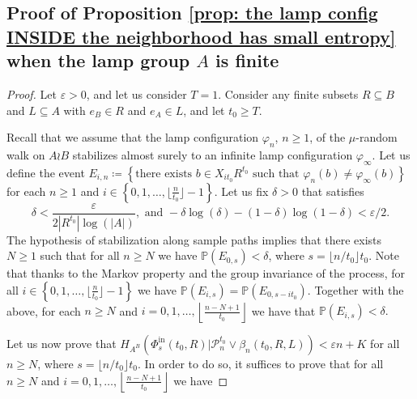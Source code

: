 \documentclass[reqno,oneside,11pt]{amsart}
\renewcommand{\P}{\mathbb{P}}
\theoremstyle{plain}
\theoremstyle{definition}
\begin{document}
\subsection{Proof of Proposition \ref{prop: the lamp config INSIDE the neighborhood has small entropy} when the lamp group $A$ is finite}\label{subsection: proof of lamps inside for FINITE lamp group}
\begin{proof}
	Let $\varepsilon>0$, and let us consider $T=1$. Consider any finite subsets $R\subseteq B$ and $L\subseteq A$ with $e_B\in R$ and $e_A\in L$, and let $t_0\ge T$. 
	
	Recall that we assume that the lamp configuration $\varphi_n$, $n\ge 1$, of the $\mu$-random walk on $A\wr B$ stabilizes almost surely to an infinite lamp configuration $\varphi_{\infty}$. Let us define the event $ E_{i,n}\coloneqq \left\{\text{there exists }b\in X_{it_0}R^{t_0}\text{ such that } \varphi_{n}(b)\neq \varphi_{\infty}(b)\right \}$ for each $n\ge 1$ and $i\in \left\{0,1,\ldots, \lfloor \frac{n}{t_0} \rfloor-1\right\}$. 
		Let us fix $\delta>0$ that satisfies 
	\begin{equation}\label{eq: choice of delta}
		\delta<\frac{\varepsilon}{2|R^{t_0}|\log(|A|)}, \text{ and } -\delta\log(\delta)-(1-\delta)\log(1-\delta)<\varepsilon/2.
	\end{equation} The hypothesis of stabilization along sample paths implies that there exists $N\ge 1$ such that for all $n\ge N$ we have $\P\left(E_{0,s}\right)<\delta$, where $s=\lfloor n/t_0\rfloor t_0$. Note that thanks to the Markov property and the group invariance of the process, for all $i\in \left\{0,1,\ldots, \lfloor \frac{n}{t_0} \rfloor-1\right\}$ we have $\P\left(E_{i, s}\right)=\P\left(E_{0,s-it_0}\right).$ Together with the above, for each $n\ge N$ and $i=0,1,\ldots, \left\lfloor\frac{n-N+1}{t_0}\right\rfloor $ we have that $\P\left(E_{i,s}\right)<\delta.$
	
	
	Let us now prove that $H_{A^{B}}\left( \Phi_{s}^{\mathrm{in}}(t_0,R)\Big| \mathcal{P}_n^{t_0}\vee \beta_n(t_0,R,L)\right)<\varepsilon n + K$ for all $n\ge N$, where $s=\lfloor n/t_0\rfloor t_0$. In order to do so, it suffices to prove that for all $n\ge N$ and $i=0,1,\ldots, \left\lfloor\frac{n-N+1}{t_0}\right\rfloor$ we have
	

\end{proof}
\end{document}
